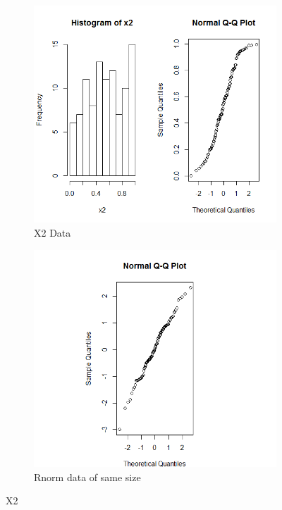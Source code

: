 \documentclass{article}
\begin{document}
    \begin{figure}
    \begin{subfigure}{.5\textwidth}
      \centering
      \includegraphics[width=.8\linewidth]{results/X2}
      \caption{X2 Data}
    \end{subfigure}
    \begin{subfigure}{.5\textwidth}
      \centering
      \includegraphics[width=.8\linewidth]{results/X2_2}
      \caption{Rnorm data of same size}
    \end{subfigure}
    \caption{X2}
    \label{fig:X2}
    \end{figure}
\end{document}
